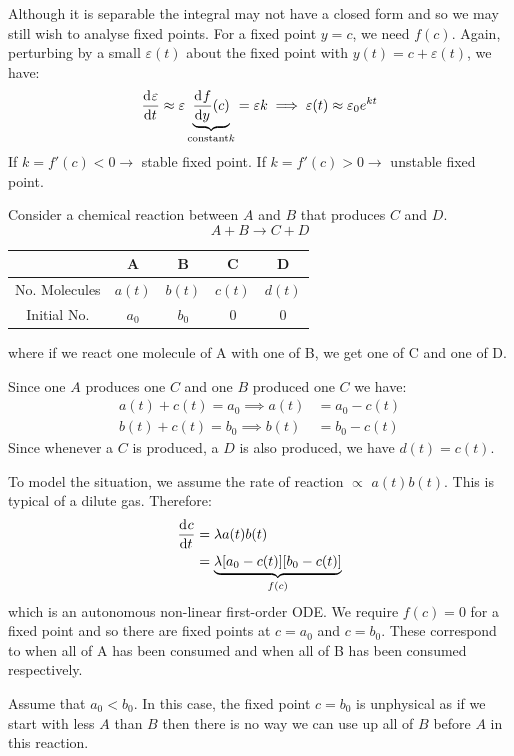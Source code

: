 \documentclass[../main.tex]{subfiles}
\begin{document}
Although it is separable the integral may not have a closed form and so we may still wish to analyse fixed points.
For a fixed point $y = c$, we need $f(c)$.
Again, perturbing by a small $\varepsilon(t)$ about the fixed point with $y(t) = c + \varepsilon(t)$, we have:
\[
  \deriv{\varepsilon}{t} \approx \varepsilon \underbrace{\deriv{f}{y}(c)}_{\text{constant} k} = \varepsilon k \implies
  \varepsilon(t) \approx \varepsilon_0 e^{kt}
\]
If $k = f'(c) < 0 \longrightarrow$ stable fixed point.
If $k = f'(c) > 0 \longrightarrow$ unstable fixed point.
\begin{example}
  Consider a chemical reaction between $A$ and $B$ that produces $C$ and $D$.
  \[
    A + B \longrightarrow C + D
  \]
  \begin{center}
  \begin{tabular}{c|c|c|c|c}
   & A & B & C & D \\
  \hline
  No. Molecules & $a(t)$ & $b(t)$ & $c(t)$ & $d(t)$ \\
  \hline
  Initial No. & $a_0$ & $b_0$ & 0 & 0
  \end{tabular}
  \end{center}
  where if we react one molecule of A with one of B, we get one of C and one of D.

  Since one $A$ produces one $C$ and one $B$ produced one $C$ we have:
  \begin{align*}
    a(t) + c(t) = a_0 \implies a(t) &= a_0 - c(t) \\
    b(t) + c(t) = b_0 \implies b(t) &= b_0 - c(t)
  \end{align*}
  Since whenever a $C$ is produced, a $D$ is also produced, we have $d(t) = c(t)$.

  To model the situation, we assume the rate of reaction $\propto$ $a(t)b(t)$.
  This is typical of a dilute gas.
  Therefore:
  \begin{align*}
    \deriv{c}{t} &= \lambda a(t)b(t) \\
                 &= \underbrace{\lambda[a_0 - c(t)][b_0 - c(t)]}_{f(c)}
  \end{align*}
  which is an autonomous non-linear first-order ODE.
  We require $f(c) = 0$ for a fixed point and so there are fixed points at $c = a_0$ and $c = b_0$.
  These correspond to when all of A has been consumed and when all of B has been consumed respectively.

  Assume that $a_0 < b_0$.
  In this case, the fixed point $c = b_0$ is unphysical as if we start with less $A$ than $B$ then there is no way we can use up all of $B$ before $A$ in this reaction.


\end{example}
\end{document}

